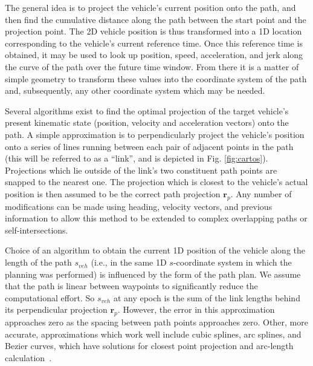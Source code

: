 \documentclass[letterpaper, 10 pt, conference]{ieeeconf}  %
\begin{document}
The general idea is to project the vehicle's current position onto the path, and then find the cumulative distance along the path between the start point and the projection point.
The 2D vehicle position is thus transformed into a 1D location corresponding to the vehicle's current reference time.
Once this reference time is obtained, it may be used to look up position, speed, acceleration, and jerk along the curve of the path over the future time window.
From there it is a matter of simple geometry to transform these values into the coordinate system of the path and, subsequently, any other coordinate system which may be needed.


Several algorithms exist to find the optimal projection of the target vehicle's present kinematic state (position, velocity and acceleration vectors) onto the path.
A simple approximation is to perpendicularly project the vehicle's position onto a series of lines running between each pair of adjacent points in the path (this will be referred to as a ``link'', and is depicted in Fig. \ref{fig:cartos}).
Projections which lie outside of the link's two constituent path points are snapped to the nearest one.
The projection which is closest to the vehicle's actual position is then assumed to be the correct path projection $\mathbf{r}_p$.
Any number of modifications can be made using heading, velocity vectors, and previous information to allow this method to be extended to complex overlapping paths or self-intersections.

Choice of an algorithm to obtain the current 1D position of the vehicle along the length of the path $s_{veh}$ (i.e., in the same 1D $s$-coordinate system in which the planning was performed) is influenced by the form of the path plan.
We assume that the path is linear between waypoints to significantly reduce the computational effort.
So $s_{veh}$ at any epoch is the sum of the link lengths behind its perpendicular projection $\mathbf{r}_p$.
However, the error in this approximation approaches zero as the spacing between path points approaches zero.
Other, more accurate, approximations which work well include cubic splines, arc splines, and Bezier curves, which have solutions for closest point projection and arc-length calculation~\cite{Wang2002,Wang2003,Schindler2011}.
\end{document}
